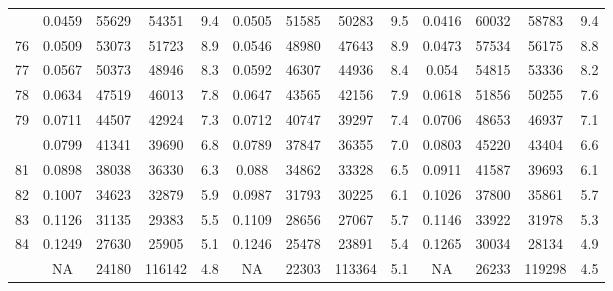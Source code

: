\documentclass[
  14pt,
]{article}
\begin{document}
\begin{longtable}[t]{lcccccccccccc}
\addlinespace
75 & 0.0459 & 55629 & 54351 & 9.4 & 0.0505 & 51585 & 50283 & 9.5 & 0.0416 & 60032 & 58783 & 9.4\\
76 & 0.0509 & 53073 & 51723 & 8.9 & 0.0546 & 48980 & 47643 & 8.9 & 0.0473 & 57534 & 56175 & 8.8\\
77 & 0.0567 & 50373 & 48946 & 8.3 & 0.0592 & 46307 & 44936 & 8.4 & 0.054 & 54815 & 53336 & 8.2\\
78 & 0.0634 & 47519 & 46013 & 7.8 & 0.0647 & 43565 & 42156 & 7.9 & 0.0618 & 51856 & 50255 & 7.6\\
79 & 0.0711 & 44507 & 42924 & 7.3 & 0.0712 & 40747 & 39297 & 7.4 & 0.0706 & 48653 & 46937 & 7.1\\
\addlinespace
80 & 0.0799 & 41341 & 39690 & 6.8 & 0.0789 & 37847 & 36355 & 7.0 & 0.0803 & 45220 & 43404 & 6.6\\
81 & 0.0898 & 38038 & 36330 & 6.3 & 0.088 & 34862 & 33328 & 6.5 & 0.0911 & 41587 & 39693 & 6.1\\
82 & 0.1007 & 34623 & 32879 & 5.9 & 0.0987 & 31793 & 30225 & 6.1 & 0.1026 & 37800 & 35861 & 5.7\\
83 & 0.1126 & 31135 & 29383 & 5.5 & 0.1109 & 28656 & 27067 & 5.7 & 0.1146 & 33922 & 31978 & 5.3\\
84 & 0.1249 & 27630 & 25905 & 5.1 & 0.1246 & 25478 & 23891 & 5.4 & 0.1265 & 30034 & 28134 & 4.9\\
\addlinespace
85 & NA & 24180 & 116142 & 4.8 & NA & 22303 & 113364 & 5.1 & NA & 26233 & 119298 & 4.5\\*
\end{longtable}
\end{document}

